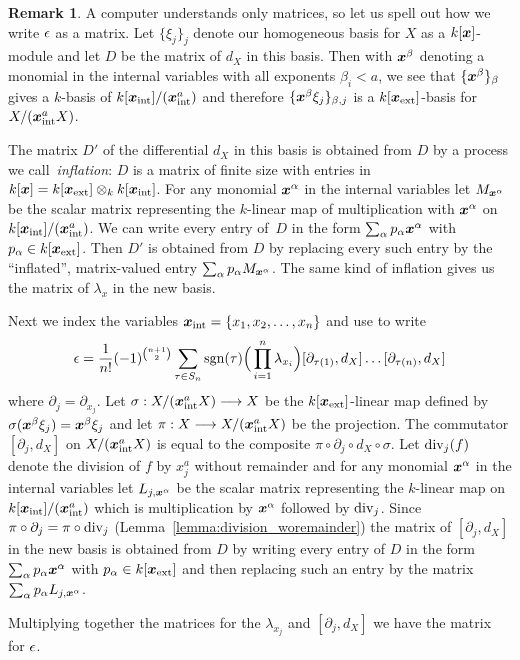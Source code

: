 \documentclass{compositio}
\theoremstyle{definition}
\newtheorem{remark}[theorem]{Remark}
\numberwithin{equation}{section}
\begin{document}
\begin{remark} A computer understands only matrices, so let us spell out how we write $\epsilon$ as a matrix. Let $\{ \xi_j \}_j$ denote our homogeneous basis for $X$ as a $k[\boldsymbol{x}]$-module and let $D$ be the matrix of $d_X$ in this basis. Then with $\boldsymbol{x}^\beta$ denoting a monomial in the internal variables with all exponents $\beta_i < a$, we see that $\{\boldsymbol{x}^\beta\}_\beta$ gives a $k$-basis of $k[\boldsymbol{x}_{\textup{int}}]/(\boldsymbol{x}_{\textup{int}}^a)$ and therefore $\{ \boldsymbol{x}^\beta \xi_j \}_{\beta, j}$ is a $k[\boldsymbol{x}_{\textup{ext}}]$-basis for $X/(\boldsymbol{x}_{\textup{int}}^a X)$.

The matrix $D'$ of the differential $d_X$ in this basis is obtained from $D$ by a process we call~\emph{inflation}: $D$ is a matrix of finite size with entries in $k[\boldsymbol{x}] = k[\boldsymbol{x}_{\textup{ext}}] \otimes_k k[\boldsymbol{x}_{\textup{int}}]$. For any monomial $\boldsymbol{x}^\alpha$ in the internal variables let $M_{\boldsymbol{x}^\alpha}$ be the scalar matrix representing the $k$-linear map of multiplication with $\boldsymbol{x}^\alpha$ on~$k[\boldsymbol{x}_{\textup{int}}]/(\boldsymbol{x}_{\textup{int}}^a)$. We can write every entry of~$D$ in the form $\sum_{\alpha} p_{\alpha} \boldsymbol{x}^\alpha$ with $p_{\alpha}\in k[\boldsymbol{x}_{\textup{ext}}]$. Then $D'$ is obtained from $D$ by replacing every such entry by the ``inflated'', matrix-valued entry $\sum_{\alpha} p_{\alpha} M_{\boldsymbol{x}^\alpha}$. 
The same kind of inflation gives us the matrix of $\lambda_x$ in the new basis.

Next we index the variables $\boldsymbol{x}_{\textup{int}} = \{x_1,x_2,\ldots,x_n\}$ and use \cite[Corollary 10.4]{dm1102.2957} to write
\[
\epsilon = \frac{1}{n!}(-1)^{\binom{n+1}{2}} \sum_{\tau \in S_n} \textup{sgn}(\tau)\Big( \prod_{i=1}^n \lambda_{x_i} \Big) [\partial_{\tau(1)}, d_X] \ldots [\partial_{\tau(n)}, d_X]
\]
where $\partial_j = \partial_{x_j}$. Let $\sigma: X/(\boldsymbol{x}_{\textup{int}}^a X) \longrightarrow X$ be the $k[\boldsymbol{x}_{\textup{ext}}]$-linear map defined by $\sigma( \boldsymbol{x}^\beta \xi_j ) = \boldsymbol{x}^\beta \xi_j$ and let $\pi: X \longrightarrow X/(\boldsymbol{x}_{\textup{int}}^a X)$ be the projection. The commutator $[\partial_j, d_X]$ on $X/(\boldsymbol{x}_{\textup{int}}^a X)$ is equal to the composite $\pi \circ \partial_j \circ d_X \circ \sigma$. Let $\textup{div}_j(f)$ denote the division of $f$ by $x_j^a$ without remainder and for any monomial $\boldsymbol{x}^\alpha$ in the internal variables let $L_{j,\boldsymbol{x}^\alpha}$ be the scalar matrix representing the $k$-linear map on $k[\boldsymbol{x}_{\textup{int}}]/(\boldsymbol{x}_{\textup{int}}^a)$ which is multiplication by $\boldsymbol{x}^\alpha$ followed by $\textup{div}_j$. Since $\pi \circ \partial_j = \pi \circ \textup{div}_j$ (Lemma~\ref{lemma:division_woremainder}) the matrix of $[\partial_j, d_X]$ in the new basis is obtained from $D$ by writing every entry of $D$ in the form $\sum_{\alpha} p_{\alpha} \boldsymbol{x}^\alpha$ with $p_{\alpha}\in k[\boldsymbol{x}_{\textup{ext}}]$ and then replacing such an entry by the matrix $\sum_{\alpha} p_{\alpha} L_{j,\boldsymbol{x}^\alpha}$.

Multiplying together the matrices for the $\lambda_{x_j}$ and $[\partial_j, d_X]$ we have the matrix for $\epsilon$.
\end{remark}
\end{document}
